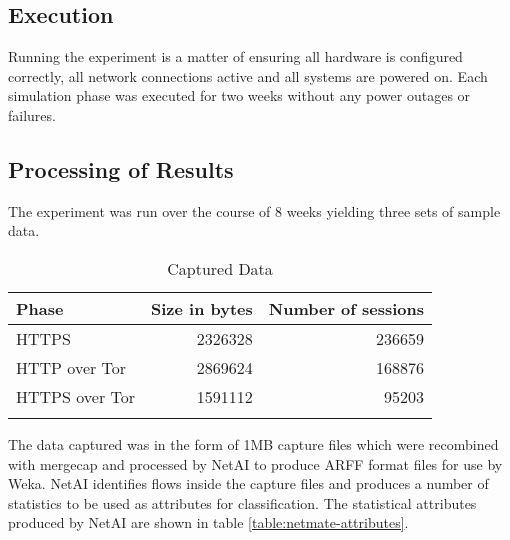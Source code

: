 \subsection{Execution}

Running the experiment is a matter of ensuring all hardware is configured
correctly, all network connections active and all systems are powered on. Each
simulation phase was executed for two weeks without any power outages or
failures.

\subsection{Processing of Results}

The experiment was run over the course of 8 weeks yielding three sets of sample
data.

\begin{table}[H]
  \begin{tabular}{lrr}
    \toprule
    Phase & Size in bytes & Number of sessions\\
    \midrule
    HTTPS & 2326328 & 236659\\
    HTTP over Tor & 2869624 & 168876\\
    HTTPS over Tor & 1591112 & 95203\\
    \bottomrule
    \label{table:datasets}
  \end{tabular}
  \caption{Captured Data}
\end{table}

The data captured was in the form of 1MB capture files which were recombined
with mergecap and processed by NetAI to produce ARFF format files for use by
Weka. NetAI identifies flows inside the capture files and produces a number
of statistics to be used as attributes for classification. The statistical
attributes produced by NetAI are shown in table \ref{table:netmate-attributes}.

